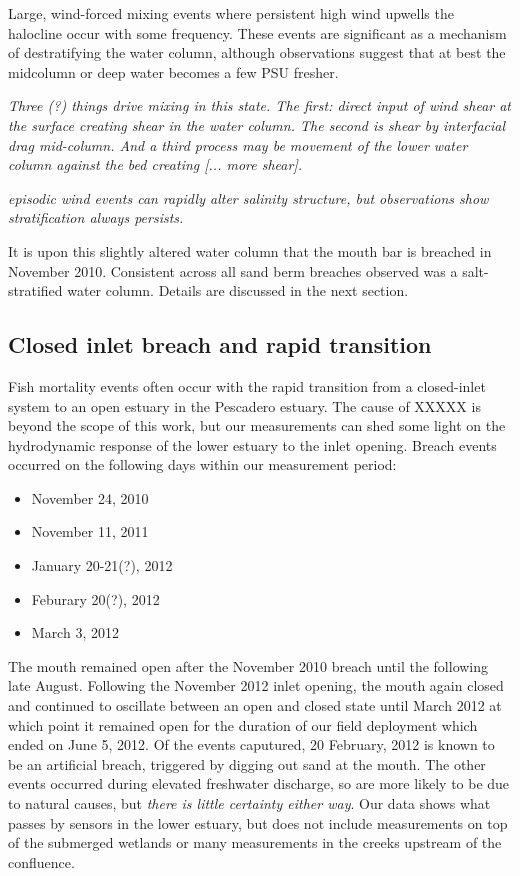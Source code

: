 Large, wind-forced mixing events where persistent high wind upwells the halocline occur with some frequency. These events are significant as a mechanism of destratifying the water column, although observations suggest that at best the midcolumn or deep water becomes a few PSU fresher. 


\emph{Three (?) things drive mixing in this state. The first: direct input of wind shear at the surface creating shear in the water column.  The second is shear by interfacial drag mid-column. And a third process may be movement of the lower water column against the bed creating [... more shear].}


\emph{episodic wind events can rapidly alter salinity structure, but observations show stratification always persists.}


It is upon this slightly altered water column that the mouth bar is breached in November 2010. Consistent across all sand berm breaches observed was a salt-stratified water column. Details are discussed in the next section. 

\subsection{Closed inlet breach and rapid transition} \label{breach_dynamics}
Fish mortality events often occur with the rapid transition from a closed-inlet system to an open estuary in the Pescadero estuary. The cause of XXXXX is beyond the scope of this work, but our measurements can shed some light on the hydrodynamic response of the lower estuary to the inlet opening. Breach events occurred on the following days within our measurement period:
\begin{itemize}
	\item November 24, 2010
	\item November 11, 2011
	\item January 20-21(?), 2012
	\item Feburary 20(?), 2012
	\item March 3, 2012
\end{itemize}
The mouth remained open after the November 2010 breach until the following late August. Following the November 2012 inlet opening, the mouth again closed and continued to oscillate between an open and closed state until March 2012 at which point it remained open for the duration of our field deployment which ended on June 5, 2012. 
Of the events caputured, 20 February, 2012 is known to be an artificial breach, triggered by digging out sand at the mouth. The other events occurred during elevated freshwater discharge, so are more likely to be due to natural causes, but \emph{there is little certainty either way}.
Our data shows what passes by sensors in the lower estuary, but does not include measurements on top of the submerged wetlands or many measurements in the creeks upstream of the confluence.

